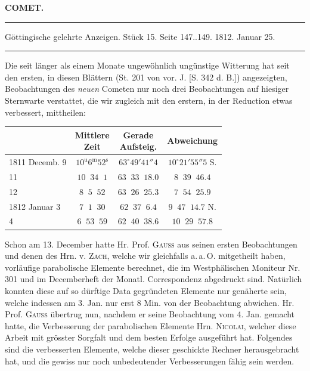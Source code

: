\clearpage{}\hypertarget{native-350-lower}{}\label{native-350-lower}
\begin{center}\textbf{COMET.}\par\vspace{4pt}\hrule\vspace{4pt}\fontsize{10}{12}\selectfont Göttingische gelehrte Anzeigen. Stück 15. Seite 147..149. 1812. Januar 25.\par\vspace{4pt}\hrule\vspace{4pt}\end{center}

\par\indent Die seit länger als einem Monate ungewöhnlich ungünstige Witterung hat seit den ersten, in diesen Blättern (St. 201 von vor. J. [S. 342 d. B.]) angezeigten, Beobachtungen des \emph{neuen} Cometen nur noch drei Beobachtungen auf hiesiger Sternwarte verstattet, die wir zugleich mit den erstern, in der Reduction etwas verbessert, mittheilen:

\begin{center}
\fontsize{10}{12}\selectfont\setlength{\tabcolsep}{3pt}\renewcommand{\arraystretch}{1.15}\begin{tabular}{l|c|c|c}
 & \shortstack{Mittlere\\Zeit} & \shortstack{Gerade\\Aufsteig.} & Abweichung \\
\hline
1811 Decemb. 9 & $10^{\text{u}}6^{\text{m}}52^{\text{s}}$ & $63^\circ49'41''4$ & $10^\circ21'55''5$ S. \\
11 & $10\;\;34\;\;1$ & $63\;\;33\;\;18.0$ & $8\;\;39\;\;46.4$ \\
12 & $8\;\;5\;\;52$ & $63\;\;26\;\;25.3$ & $7\;\;54\;\;25.9$ \\
1812 Januar 3 & $7\;\;1\;\;30$ & $62\;\;37\;\;6.4$ & $9\;\;47\;\;14.7$ N. \\
4 & $6\;\;53\;\;59$ & $62\;\;40\;\;38.6$ & $10\;\;29\;\;57.8$ \\
\end{tabular}
\end{center}

\noindent Schon am 13. December hatte Hr. Prof. \textsc{Gauss} aus seinen ersten Beobachtungen und denen des Hrn. v. \textsc{Zach}, welche wir gleichfalls a.\,a.\,O. mitgetheilt haben, vorläufige parabolische Elemente berechnet, die im Westphälischen Moniteur Nr.\,301 und im Decemberheft der Monatl. Correspondenz abgedruckt sind. Natürlich konnten diese auf so dürftige Data gegründeten Elemente nur genäherte sein, welche indessen am 3. Jan. nur erst 8 Min. von der Beobachtung abwichen. Hr. Prof. \textsc{Gauss} übertrug nun, nachdem er seine Beobachtung vom 4. Jan. gemacht hatte, die Verbesserung der parabolischen Elemente Hrn. \textsc{Nicolai}, welcher diese Arbeit mit grösster Sorgfalt und dem besten Erfolge ausgeführt hat. Folgendes sind die verbesserten Elemente, welche dieser geschickte Rechner herausgebracht hat, und die gewiss nur noch unbedeutender Verbesserungen fähig sein werden.

